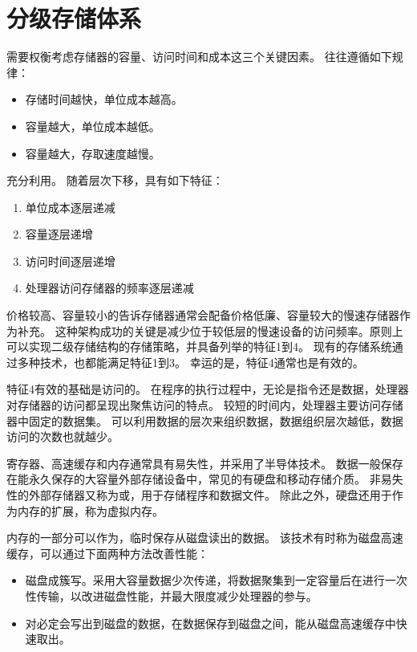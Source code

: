
\section{分级存储体系}
{
    需要权衡考虑存储器的容量、访问时间和成本这三个关键因素。
    往往遵循如下规律：

    \begin{itemize}
        \item 存储时间越快，单位成本越高。
        \item 容量越大，单位成本越低。
        \item 容量越大，存取速度越慢。
    \end{itemize}

    充分利用。
    随着层次下移，具有如下特征：

    \begin{enumerate}
        \item 单位成本逐层递减
        \item 容量逐层递增
        \item 访问时间逐层递增
        \item 处理器访问存储器的频率逐层递减
    \end{enumerate}

    价格较高、容量较小的告诉存储器通常会配备价格低廉、容量较大的慢速存储器作为补充。
    这种架构成功的关键是减少位于较低层的慢速设备的访问频率。原则上可以实现二级存储结构的存储策略，并具备列举的特征1到4。
    现有的存储系统通过多种技术，也都能满足特征1到3。
    幸运的是，特征4通常也是有效的。

    特征4有效的基础是访问的。
    在程序的执行过程中，无论是指令还是数据，处理器对存储器的访问都呈现出聚焦访问的特点。
    较短的时间内，处理器主要访问存储器中固定的数据集。
    可以利用数据的层次来组织数据，数据组织层次越低，数据访问的次数也就越少。

    寄存器、高速缓存和内存通常具有易失性，并采用了半导体技术。
    数据一般保存在能永久保存的大容量外部存储设备中，常见的有硬盘和移动存储介质。
    非易失性的外部存储器又称为或，用于存储程序和数据文件。
    除此之外，硬盘还用于作为内存的扩展，称为虚拟内存。

    内存的一部分可以作为，临时保存从磁盘读出的数据。
    该技术有时称为磁盘高速缓存，可以通过下面两种方法改善性能：

    \begin{itemize}
        \item 磁盘成簇写。采用大容量数据少次传递，将数据聚集到一定容量后在进行一次性传输，以改进磁盘性能，并最大限度减少处理器的参与。
        \item 对必定会写出到磁盘的数据，在数据保存到磁盘之间，能从磁盘高速缓存中快速取出。
    \end{itemize}
}
